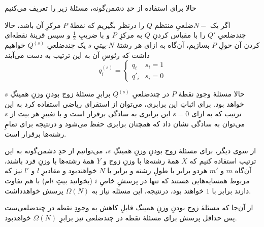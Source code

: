 حالا برای استفاده از حدِ دشمن‌گونه، مسئلهٔ زیر را تعریف می‌کنیم

اگر یک $N-$ضلعیِ منتظم $Q$ را درنظر بگیریم که نقطهٔ $P$ مرکزِ آن باشد، حالا چندضلعیِ $Q'$ را با مقیاس کردنِ $Q$ به مرکزِ $P$ و با ضریبِ 
$\frac{1}{2}$
 و سپس قرینهٔ نقطه‌ای کردن آن حولِ $P$ بسازیم، آن‌گاه به ازای هر رشتهٔ $N$-بیتیِ $s$ یک چندضلعیِ 
 $Q^{(s)}$
 خواهیم داشت که رئوسِ آن به این ترتیب به دست می‌آیند
\begin{equation}
 q^{(s)}_i = \begin{cases}
  q_i & s_i = 1 \\
  q'_i & s_i = 0
 \end{cases}
\end{equation} 

حالا مسئلهٔ وجودِ نقطهٔ $P$ در چندضلعیِ $Q^{(s)}$ برابرِ مسئلهٔ زوج بودنِ وزنِ همینگِ $s$ خواهد بود. برای اثباتِ این برابری، می‌توان از استقرای ریاضی استفاده کرد به این ترتیب که به ازای $s=0$ این برابری به سادگی برقرار است و با تغییرِ هر بیت از $s$ می‌توان به سادگی نشان داد که همچنان برابری حفظ می‌شود و درنتیجه برای تمامِ رشته‌ها برقرار است.

از سوی دیگر، برای مسئلهٔ زوج بودنِ وزنِ همینگِ $s$، می‌توانیم از حدِ دشمن‌گونه به این ترتیب استفاده کنیم که $X$ همهٔ رشته‌ها با وزنِ زوج و $Y$ همهٔ رشته‌ها با وزنِ فرد باشند، آن‌گاه $m$ و $m'$ هردو برابر با طولِ رشته و برابر با $N$ خواهندبود و مقادیرِ $l$ و $l'$ نیز که مربوط همسایه‌هایی هستند که تنها در پرسشِ خاصِ $i$ (بخوانید بیتِ $i$ام) با هم تفاوت دارند برابر با $1$ خواهند بود، درنتیجه، این مسئله نیاز به 
$\Omega(N)$
پرسش خواهدداشت.

از آن‌جا که مسئلهٔ زوج بودنِ وزنِ همینگ قابلِ کاهش به وجودِ نقطه در چندضلعی‌ست پس حداقل پرسش برای مسئلهٔ نقطه در چندضلعی نیز برابرِ 
$\Omega(N)$
خواهدبود.

